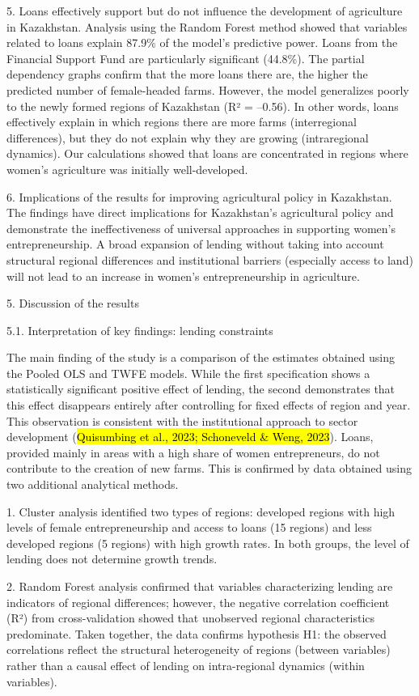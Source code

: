 5. Loans effectively support but do not influence the development of
agriculture in Kazakhstan. Analysis using the Random Forest method
showed that variables related to loans explain 87.9\% of the model's
predictive power. Loans from the Financial Support Fund are particularly
significant (44.8\%). The partial dependency graphs confirm that the
more loans there are, the higher the predicted number of female-headed
farms. However, the model generalizes poorly to the newly formed regions
of Kazakhstan (R² = --0.56). In other words, loans effectively explain
in which regions there are more farms (interregional differences), but
they do not explain why they are growing (intraregional dynamics). Our
calculations showed that loans are concentrated in regions where women's
agriculture was initially well-developed.

6. Implications of the results for improving agricultural policy in
Kazakhstan. The findings have direct implications for Kazakhstan's
agricultural policy and demonstrate the ineffectiveness of universal
approaches in supporting women's entrepreneurship. A broad expansion of
lending without taking into account structural regional differences and
institutional barriers (especially access to land) will not lead to an
increase in women's entrepreneurship in agriculture.

5. Discussion of the results

5.1. Interpretation of key findings: lending constraints

The main finding of the study is a comparison of the estimates obtained
using the Pooled OLS and TWFE models. While the first specification
shows a statistically significant positive effect of lending, the second
demonstrates that this effect disappears entirely after controlling for
fixed effects of region and year. This observation is consistent with
the institutional approach to sector development (\hl{Quisumbing et al.,
2023; Schoneveld \& Weng, 2023}). Loans, provided mainly in areas with a
high share of women entrepreneurs, do not contribute to the creation of
new farms. This is confirmed by data obtained using two additional
analytical methods.

1. Cluster analysis identified two types of regions: developed regions
with high levels of female entrepreneurship and access to loans (15
regions) and less developed regions (5 regions) with high growth rates.
In both groups, the level of lending does not determine growth trends.

2. Random Forest analysis confirmed that variables characterizing
lending are indicators of regional differences; however, the negative
correlation coefficient (R²) from cross-validation showed that
unobserved regional characteristics predominate. Taken together, the
data confirms hypothesis H1: the observed correlations reflect the
structural heterogeneity of regions (between variables) rather than a
causal effect of lending on intra-regional dynamics (within variables).

